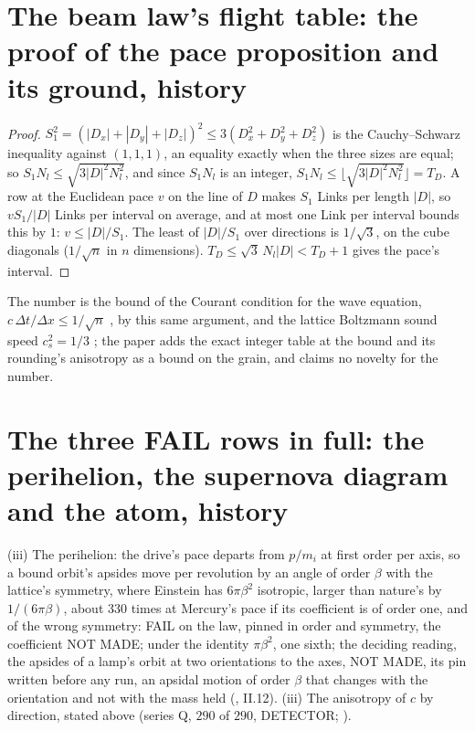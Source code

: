 \section{The beam law's flight table: the proof of the pace proposition and its ground, history}\label{rec:oldflight}

\begin{proof}
$S_1^2 = (|D_x| + |D_y| + |D_z|)^2 \le 3(D_x^2 + D_y^2 + D_z^2)$ is the
Cauchy--Schwarz inequality against $(1, 1, 1)$, an equality exactly when
the three sizes are equal; so $S_1 N_l \le \sqrt{3|D|^2N_l^2}$, and since
$S_1 N_l$ is an integer, $S_1 N_l \le \lfloor\sqrt{3|D|^2N_l^2}\rfloor =
T_D$. A row at the Euclidean pace $v$ on the line of $D$ makes $S_1$
Links per length $|D|$, so $vS_1/|D|$ Links per interval on average, and
at most one Link per interval bounds this by $1$: $v \le |D|/S_1$. The
least of $|D|/S_1$ over directions is $1/\sqrt3$, on the cube diagonals
($1/\sqrt n$ in $n$ dimensions). $T_D \le \sqrt3\,N_l|D| < T_D + 1$ gives
the pace's interval.
\end{proof}


The number is the bound of the Courant condition for the wave equation, $c\,\Delta t/\Delta x \le 1/\sqrt n$ \cite{cfl1928}, by this same argument, and the lattice Boltzmann sound speed $c_s^2 = 1/3$ \cite{qian1992}; the paper adds the exact integer table at the bound and its rounding's anisotropy as a bound on the grain, and claims no novelty for the number. 

\section{The three FAIL rows in full: the perihelion, the supernova diagram and the atom, history}\label{rec:failrows}

(iii) The perihelion: the drive's pace departs from $p/m_i$ at first order per axis, so a bound orbit's apsides move per revolution by an angle of order $\beta$ with the lattice's symmetry, where Einstein has $6\pi\beta^2$ isotropic, larger than nature's by $1/(6\pi\beta)$, about $330$ times at Mercury's pace if its coefficient is of order one, and of the wrong symmetry: FAIL on the law, pinned in order and symmetry, the coefficient NOT MADE; under the identity $\pi\beta^2$, one sixth; the deciding reading, the apsides of a lamp's orbit at two orientations to the axes, NOT MADE, its pin written before any run, an apsidal motion of order $\beta$ that changes with the orientation and not with the mass held (\cite{einsteinoutside}, II.12).  (iii) The anisotropy of $c$ by direction, stated above (series Q, $290$ of $290$, DETECTOR; \cite{lightoutside}).

